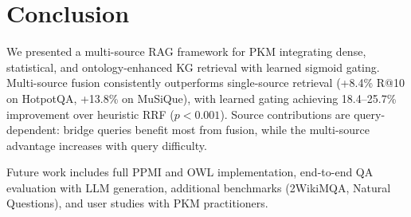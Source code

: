 \documentclass[preprint,12pt]{elsarticle}
\begin{document}
\section{Conclusion}
\label{sec:conclusion}

We presented a multi-source RAG framework for PKM integrating dense, statistical, and ontology-enhanced KG retrieval with learned sigmoid gating. Multi-source fusion consistently outperforms single-source retrieval (+8.4\% R@10 on HotpotQA, +13.8\% on MuSiQue), with learned gating achieving 18.4--25.7\% improvement over heuristic RRF ($p<0.001$). Source contributions are query-dependent: bridge queries benefit most from fusion, while the multi-source advantage increases with query difficulty.

Future work includes full PPMI and OWL implementation, end-to-end QA evaluation with LLM generation, additional benchmarks (2WikiMQA, Natural Questions), and user studies with PKM practitioners.



\end{document}

